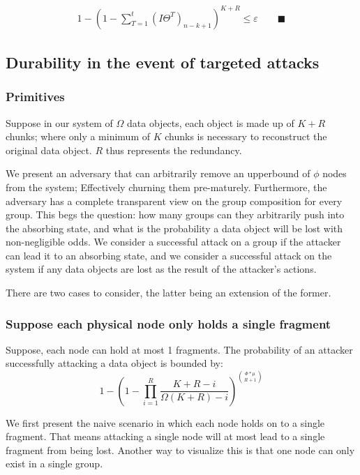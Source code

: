 \begin{gather}
    1-(1-\sum_{T=1}^{t} (I \Theta^{T})_{n-k+1})^{K+R} \leq \varepsilon \qquad\blacksquare
\end{gather}


\subsection{Durability in the event of targeted attacks}

\subsubsection{Primitives}
Suppose in our system of $\Omega$ data objects, each object is made up of $K+R$ chunks; where only a minimum of $K$ chunks is necessary to reconstruct the original data object. $R$ thus represents the redundancy.

We present an adversary that can arbitrarily remove an upperbound of $\phi$ nodes from the system; Effectively churning them pre-maturely.
Furthermore, the adversary has a complete transparent view on the group composition for every group.
This begs the question: how many groups can they arbitrarily push into the absorbing state, and what is the probability a data object will be lost with non-negligible odds. We consider a successful attack on a group if the attacker can lead it to an absorbing state, and we consider a successful attack on the system if any data objects are lost as the result of the attacker's actions. 

There are two cases to consider, the latter being an extension of the former. 

\subsubsection{Suppose each physical node only holds a single fragment}
\begin{lemma} \label{lemma 3}
    Suppose, each node can hold at most 1 fragments.
    The probability of an attacker successfully attacking a data object is bounded by:
    \[
        1-
        \left(
        1-\prod_{i=1}^{R}\frac{K+R-i}{\Omega(K+R)-i}
        \right)^{\binom{\Phi*\mu}{R+1}}
    \]
\end{lemma}

We first present the naive scenario in which each node holds on to a single fragment. That means attacking a single node will at most lead to a single fragment from being lost. Another way to visualize this is that one node can only exist in a single group. 

